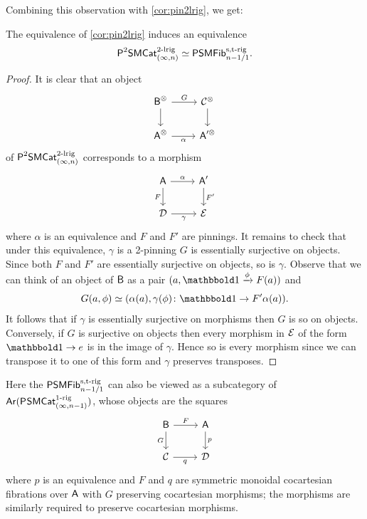 \documentclass[a4paper,11pt]{article}
\begin{document}
Combining this observation with \cref{cor:pin2lrig}, we get:
\begin{cor}\label{cor:unf to square step 1}
  The equivalence of \cref{cor:pin2lrig} induces an equivalence
  \[ \PSMCatIn[2]^{2\dlrig} \simeq 
    \PSMFibstrig_{n-1/1}.\]
\end{cor}
\begin{proof}
  It is clear that an object 
      \[
    \begin{tikzcd}
     \oB^{\otimes} \ar[r, "G"] \ar[d] & \nC^{\otimes}  \ar[d] \\
     \oA^{\otimes} \ar[r, "\alpha"'] & \oA'^{\otimes}
    \end{tikzcd}
  \]
  of $\PSMCatIn[2]^{2\dlrig}$
  corresponds to a morphism
  \[
    \begin{tikzcd}
     \oA \ar[r, "\alpha"] \ar[d, "F"'] & \oA'  \ar[d, "F'"] \\
     \nD \ar[r, "\gamma"'] & \nE
    \end{tikzcd}
  \]
  where $\alpha$ is an equivalence and $F$ and $F'$ are pinnings. It
  remains to check that under this equivalence, $\gamma$ is a
  2-pinning \IFF{} $G$ is essentially surjective on objects. Since
  both $F$ and $F'$ are essentially surjective on objects, so is
  $\gamma$. Observe that we can think of an object of $\oB$ as a pair
  $(a, \bbone \xto{\phi} F(a))$ and \[G(a, \phi) \simeq (\alpha(a),
    \gamma(\phi) \colon \bbone \to F'\alpha(a)).\]
  It follows that if $\gamma$ is essentially surjective on morphisms
  then $G$ is so on objects. Conversely, if $G$ is surjective on
  objects then every morphism in $\nE$ of the form $\bbone \to e$ is
  in the image of $\gamma$. Hence so is every morphism since we can
  transpose it to one of this form and $\gamma$ preserves transposes.
\end{proof}

\begin{observation}
  Here the \icat{} $\PSMFibstrig_{n-1/1}$ can also be viewed as a subcategory of
  $\Ar(\PSMCat_{(\infty,n-1)}^{\orig})$, whose objects are the squares
  \[
    \begin{tikzcd}
      \oB \ar[r, "F"] \ar[d, "G"'] & \oA  \ar[d, "p"] \\
      \nC \ar[r, "q"'] & \nD
    \end{tikzcd}
  \]
  where $p$ is an equivalence and $F$ and $q$ are symmetric monoidal
  cocartesian fibrations over $\oA$ with $G$ preserving cocartesian
  morphisms; the morphisms are similarly required to preserve
  cocartesian morphisms.
\end{observation}
\end{document}
